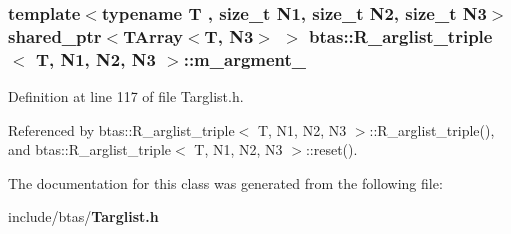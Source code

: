 \subsubsection[{m\-\_\-argment\-\_\-3}]{\setlength{\rightskip}{0pt plus 5cm}template$<$typename T , size\-\_\-t N1, size\-\_\-t N2, size\-\_\-t N3$>$ shared\-\_\-ptr$<${\bf T\-Array}$<$T, N3$>$ $>$ {\bf btas\-::\-R\-\_\-arglist\-\_\-triple}$<$ T, N1, N2, N3 $>$\-::m\-\_\-argment\-\_\hspace{0.3cm}{\ttfamily [protected]}}\label{dd/d0a/classbtas_1_1R__arglist__triple_a547146621d7049e16fcd70133bd4267a}


Definition at line 117 of file Targlist.\-h.



Referenced by btas\-::\-R\-\_\-arglist\-\_\-triple$<$ T, N1, N2, N3 $>$\-::\-R\-\_\-arglist\-\_\-triple(), and btas\-::\-R\-\_\-arglist\-\_\-triple$<$ T, N1, N2, N3 $>$\-::reset().



The documentation for this class was generated from the following file\-:\begin{DoxyCompactItemize}
\item 
include/btas/{\bf Targlist.\-h}\end{DoxyCompactItemize}
